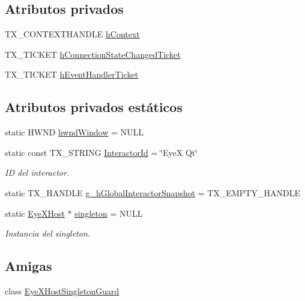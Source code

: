 \subsection*{Atributos privados}
\begin{DoxyCompactItemize}
\item 
T\+X\+\_\+\+C\+O\+N\+T\+E\+X\+T\+H\+A\+N\+D\+L\+E \hyperlink{class_eye_x_host_aa25acc2fc272389da12f9cd22e3481aa}{h\+Context}
\item 
T\+X\+\_\+\+T\+I\+C\+K\+E\+T \hyperlink{class_eye_x_host_a5d7aa14e1384f6c130027ca0ae1ae823}{h\+Connection\+State\+Changed\+Ticket}
\item 
T\+X\+\_\+\+T\+I\+C\+K\+E\+T \hyperlink{class_eye_x_host_a2b6ed6e26a4a695501165886230cfcab}{h\+Event\+Handler\+Ticket}
\end{DoxyCompactItemize}
\subsection*{Atributos privados estáticos}
\begin{DoxyCompactItemize}
\item 
static H\+W\+N\+D \hyperlink{class_eye_x_host_a9791baa4b1f20d3007d46d37e657ff43}{hwnd\+Window} = N\+U\+L\+L
\item 
static const T\+X\+\_\+\+S\+T\+R\+I\+N\+G \hyperlink{class_eye_x_host_ad5318e87583fd9f98c8831a6f40b0a85}{Interactor\+Id} = \char`\"{}Eye\+X Qt\char`\"{}
\begin{DoxyCompactList}\small\item\em I\+D del interactor. \end{DoxyCompactList}\item 
static T\+X\+\_\+\+H\+A\+N\+D\+L\+E \hyperlink{class_eye_x_host_a212d54acb5dd498a5c7caa654bdcac1a}{g\+\_\+h\+Global\+Interactor\+Snapshot} = T\+X\+\_\+\+E\+M\+P\+T\+Y\+\_\+\+H\+A\+N\+D\+L\+E
\item 
static \hyperlink{class_eye_x_host}{Eye\+X\+Host} $\ast$ \hyperlink{class_eye_x_host_ab27a57316b24225ee35e50ebd752e962}{singleton} = N\+U\+L\+L
\begin{DoxyCompactList}\small\item\em Instancia del singleton. \end{DoxyCompactList}\end{DoxyCompactItemize}
\subsection*{Amigas}
\begin{DoxyCompactItemize}
\item 
class \hyperlink{class_eye_x_host_ac70a4275d1360ff292e3ce4e1b00b6f0}{Eye\+X\+Host\+Singleton\+Guard}
\end{DoxyCompactItemize}



